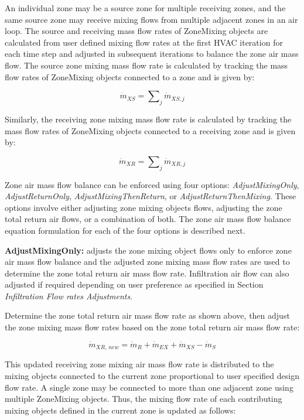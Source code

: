 An individual zone may be a source zone for multiple receiving zones, and the same source zone may receive mixing flows from multiple adjacent zones in an air loop. The source and receiving mass flow rates of ZoneMixing objects are calculated from user defined mixing flow rates at the first HVAC iteration for each time step and adjusted in subsequent iterations to balance the zone air mass flow. The source zone mixing mass flow rate is calculated by tracking the mass flow rates of ZoneMixing objects connected to a zone and is given by:

\begin{equation}
{\dot m_{XS}} = \sum\nolimits_j {{{\dot m}_{XS,j}}}
\end{equation}

Similarly, the receiving zone mixing mass flow rate is calculated by tracking the mass flow rates of ZoneMixing objects connected to a receiving zone and is given by:

\begin{equation}
{\dot m_{XR}} = \sum\nolimits_j {{{\dot m}_{XR,j}}}
\end{equation}

Zone air mass flow balance can be enforced using four options: \textit{AdjustMixingOnly}, \textit{AdjustReturnOnly}, \textit{AdjustMixingThenReturn}, or \textit{AdjustReturnThenMixing}.  These options involve either adjusting zone mixing objects flows, adjusting the zone total return air flows, or a 
combination of both. The zone air mass flow balance equation formulation for each of the four options is described next.

\textbf{AdjustMixingOnly:} adjusts the zone mixing object flows only to enforce zone air mass flow balance and the adjusted zone mixing mass flow rates are used to determine the zone total return air mass flow rate. Infiltration air flow can also adjusted if required depending on user preference as specified in Section \textit{Infiltration Flow rates Adjustments}.

Determine the zone total return air mass flow rate as shown above, then adjust the zone mixing mass flow rates based on the zone total return air mass flow rate:

\begin{equation}
{\dot m_{XR,\,new}} = {\dot m_R} + {\dot m_{EX}} + {\dot m_{XS}} - {\dot m_S}
\end{equation}

This updated receiving zone mixing air mass flow rate is distributed to the mixing objects connected to the current zone proportional to user specified design flow rate. A single zone may be connected to more than one adjacent zone using multiple ZoneMixing objects. Thus, the mixing flow rate of each contributing mixing objects defined in the current zone is updated as follows:

